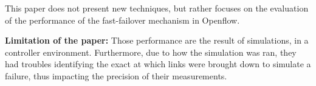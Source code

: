 \documentclass[compsoc]{IEEEtran}
\begin{document}
This paper does not present new techniques, but rather focuses on the evaluation of the performance of the fast-failover mechanism in Openflow. 

\textbf{Limitation of the paper:}
Those performance are the result of simulations, in a controller environment. Furthermore, due to how the simulation was ran, they had troubles identifying the exact at which links were brought down to simulate a failure, thus impacting the precision of their measurements.
\end{document}
